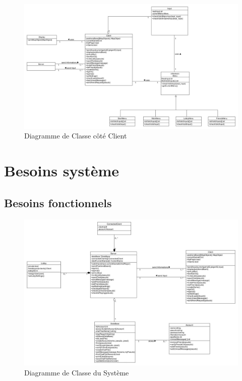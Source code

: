 \documentclass[a4paper,12pt]{article}
\begin{document}
\begin{figure}[hbtp]
\centering
\includegraphics[scale=0.3]{images/newClientClassDiagram.jpg}
\caption{Diagramme de Classe côté Client}
\end{figure}

\newpage

\section{Besoins système}
\subsection{Besoins fonctionnels}

\begin{figure}[h!]
\centering
\includegraphics[width=16cm]{images/newSystemClassDiagram.jpg}
\caption{Diagramme de Classe du Système}
\label{fig:UerUseCase}
\end{figure}
\end{document}
